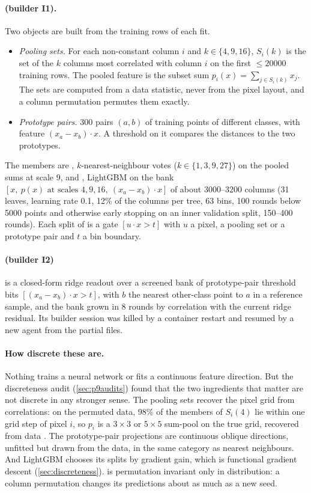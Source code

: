 \paragraph{ (builder I1).} Two objects are built from the training rows of each fit.
\begin{itemize}
\item \emph{Pooling sets.} For each non-constant column $i$ and $k\in\{4,9,16\}$, $S_i(k)$ is the set of the $k$ columns most correlated with column $i$ on the first $\le20000$ training rows. The pooled feature is the subset sum $p_i(x)=\sum_{j\in S_i(k)}x_j$. The sets are computed from a data statistic, never from the pixel layout, and a column permutation permutes them exactly.
\item \emph{Prototype pairs.} 300 pairs $(a,b)$ of training points of different classes, with feature $(x_a-x_b)\cdot x$. A threshold on it compares the distances to the two prototypes.
\end{itemize}
The members are , $k$-nearest-neighbour votes ($k\in\{1,3,9,27\}$) on the pooled sums at scale 9, and , LightGBM on the bank $[x,\ p(x)\text{ at scales }4,9,16,\ (x_a-x_b)\cdot x]$ of about 3000--3200 columns (31 leaves, learning rate 0.1, 12\% of the columns per tree, 63 bins, 100 rounds below 5000 points and otherwise early stopping on an inner validation split, 150--400 rounds). Each split of  is a gate $[u\cdot x>t]$ with $u$ a pixel, a pooling set or a prototype pair and $t$ a bin boundary.

\paragraph{ (builder I2)} is a closed-form ridge readout over a screened bank of prototype-pair threshold bits $[(x_a-x_b)\cdot x>t]$, with $b$ the nearest other-class point to $a$ in a reference sample, and the bank grown in 8 rounds by correlation with the current ridge residual. Its builder session was killed by a container restart and resumed by a new agent from the partial files.

\paragraph{How discrete these are.} Nothing trains a neural network or fits a continuous feature direction. But the discreteness audit (\cref{sec:p9audits}) found that the two ingredients that matter are not discrete in any stronger sense. The pooling sets recover the pixel grid from correlations: on the permuted  data, 98\% of the members of $S_i(4)$ lie within one grid step of pixel $i$, so $p_i$ is a $3\times3$ or $5\times5$ sum-pool on the true grid, recovered from data \cite{leroux2007topology,coates2011receptive}. The prototype-pair projections are continuous oblique directions, unfitted but drawn from the data, in the same category as nearest neighbours. And LightGBM chooses its splits by gradient gain, which is functional gradient descent (\cref{sec:discreteness}).  is permutation invariant only in distribution: a column permutation changes its predictions about as much as a new seed.

